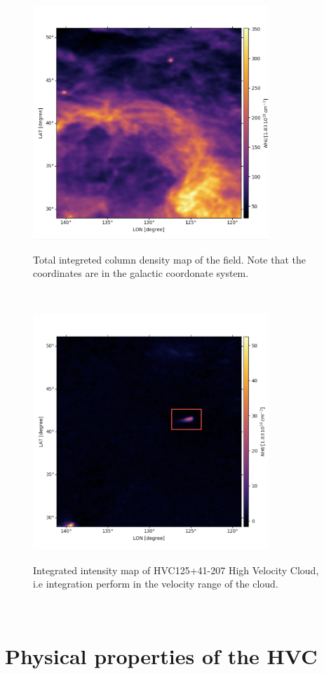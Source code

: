 \documentclass[a4paper,10.5pt]{report}
\begin{document}
\begin{figure}[h!]
  \centering
  \includegraphics[width=3.5in]{field.png}
  \label{fig::hyperspectral}
  \caption{Total integreted column density map of the field. Note that the coordinates are in the galactic coordonate system.}
\end{figure} \\

\begin{figure}[h!]
  \centering
  \includegraphics[width=3.5in]{hvc_select.png}
  \label{fig::hvc}
  \caption{Integrated intensity map of HVC125+41-207 High Velocity Cloud, i.e integration perform in the velocity range of the cloud.}
\end{figure} \\

\chapter{Physical properties of the HVC}
\end{document}
